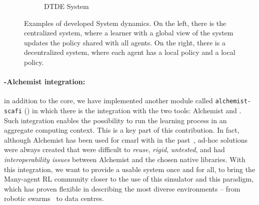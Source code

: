 \begin{figure}[t]
\begin{subfigure}[b]{0.49\textwidth}
        \caption{DTDE System}
        \label{fig:dtde}
    \end{subfigure}
\caption[Examples of developed System dynamics in \scarlib{}]{Examples of developed System dynamics. 
On the left, there is the centralized system, 
where a learner with a global view of the system 
updates the policy shared with all agents. 
%
On the right, there is a decentralized system, 
where each agent has a local policy and a local policy.}
\end{figure}

\paragraph{\scafi{}-Alchemist integration:} in addition to the core, we have implemented another module called \texttt{alchemist-scafi} () 
 in which there is the integration with the two tools: 
 Alchemist \cite{DBLP:journals/jos/PianiniMV13} and \scafi{} \cite{Casadei2022}.
%
Such integration enables the possibility to run the learning process 
 in an aggregate computing context.
This is a key part of this contribution. 
 In fact, although Alchemist has been used for \ac{cmarl} with \scafi{} in the past~\cite{Aguzzi2022,DBLP:conf/acsos/AguzziCV22}, 
 ad-hoc solutions were always created that were difficult to \emph{reuse}, 
 \emph{rigid}, \emph{untested}, and had \emph{interoperability issues} between Alchemist 
 and the chosen native libraries.
With this integration, 
 we want to provide a usable system once and for all, 
 to bring the Many-agent RL community closer 
 to the use of this simulator and this paradigm, 
 which has proven flexible in describing the most diverse environments -- 
 from robotic swarms~\cite{Casadei2021} to data centres.

